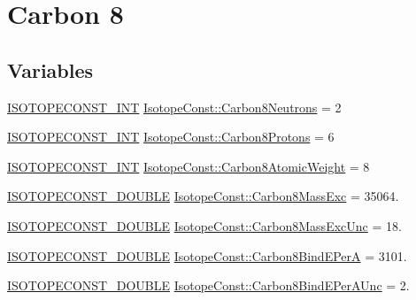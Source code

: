\hypertarget{group___isotope_const-_carbon-_c8}{}\section{Carbon 8}
\label{group___isotope_const-_carbon-_c8}
\subsection*{Variables}
\begin{DoxyCompactItemize}
\item 
\mbox{\hyperlink{group___isotope_const-_macros_ga5f18360b3e99483a35c32d789e62621c}{I\+S\+O\+T\+O\+P\+E\+C\+O\+N\+S\+T\+\_\+\+I\+NT}} \mbox{\hyperlink{group___isotope_const-_carbon-_c8_ga73bd0753f3cd08052ae1d2f57ef01285}{Isotope\+Const\+::\+Carbon8\+Neutrons}} = 2
\item 
\mbox{\hyperlink{group___isotope_const-_macros_ga5f18360b3e99483a35c32d789e62621c}{I\+S\+O\+T\+O\+P\+E\+C\+O\+N\+S\+T\+\_\+\+I\+NT}} \mbox{\hyperlink{group___isotope_const-_carbon-_c8_ga937b306870a07c9b8ecfe538c85a3328}{Isotope\+Const\+::\+Carbon8\+Protons}} = 6
\item 
\mbox{\hyperlink{group___isotope_const-_macros_ga5f18360b3e99483a35c32d789e62621c}{I\+S\+O\+T\+O\+P\+E\+C\+O\+N\+S\+T\+\_\+\+I\+NT}} \mbox{\hyperlink{group___isotope_const-_carbon-_c8_ga6acd092e90d240f1dd07d3cdaf143398}{Isotope\+Const\+::\+Carbon8\+Atomic\+Weight}} = 8
\item 
\mbox{\hyperlink{group___isotope_const-_macros_ga8f45a7272ce02c0b4c65c44636ed719a}{I\+S\+O\+T\+O\+P\+E\+C\+O\+N\+S\+T\+\_\+\+D\+O\+U\+B\+LE}} \mbox{\hyperlink{group___isotope_const-_carbon-_c8_gad310351b0b0b73ad200189de809a8deb}{Isotope\+Const\+::\+Carbon8\+Mass\+Exc}} = 35064.
\item 
\mbox{\hyperlink{group___isotope_const-_macros_ga8f45a7272ce02c0b4c65c44636ed719a}{I\+S\+O\+T\+O\+P\+E\+C\+O\+N\+S\+T\+\_\+\+D\+O\+U\+B\+LE}} \mbox{\hyperlink{group___isotope_const-_carbon-_c8_ga2564393be877ca51e1e463ca4dce59cd}{Isotope\+Const\+::\+Carbon8\+Mass\+Exc\+Unc}} = 18.
\item 
\mbox{\hyperlink{group___isotope_const-_macros_ga8f45a7272ce02c0b4c65c44636ed719a}{I\+S\+O\+T\+O\+P\+E\+C\+O\+N\+S\+T\+\_\+\+D\+O\+U\+B\+LE}} \mbox{\hyperlink{group___isotope_const-_carbon-_c8_ga1ad2f452cd3b654e15d73f18ac101408}{Isotope\+Const\+::\+Carbon8\+Bind\+E\+PerA}} = 3101.
\item 
\mbox{\hyperlink{group___isotope_const-_macros_ga8f45a7272ce02c0b4c65c44636ed719a}{I\+S\+O\+T\+O\+P\+E\+C\+O\+N\+S\+T\+\_\+\+D\+O\+U\+B\+LE}} \mbox{\hyperlink{group___isotope_const-_carbon-_c8_gad58127dcd8de407439eefc05d28a9a8e}{Isotope\+Const\+::\+Carbon8\+Bind\+E\+Per\+A\+Unc}} = 2.

\end{DoxyCompactItemize}
